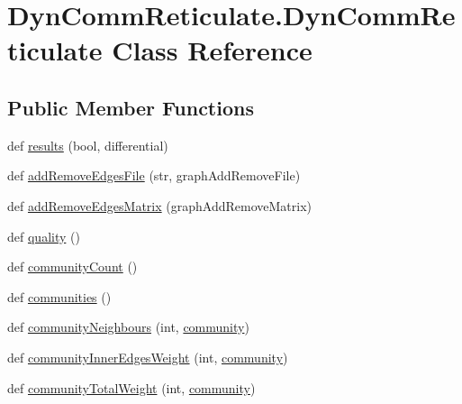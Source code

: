 \hypertarget{classDynCommReticulate_1_1DynCommReticulate}{}\section{Dyn\+Comm\+Reticulate.\+Dyn\+Comm\+Reticulate Class Reference}
\label{classDynCommReticulate_1_1DynCommReticulate}
\subsection*{Public Member Functions}
\begin{DoxyCompactItemize}
\item 
def \hyperlink{classDynCommReticulate_1_1DynCommReticulate_a82340da0cccc70aa945171cfb92f834f}{results} (bool, differential)
\item 
def \hyperlink{classDynCommReticulate_1_1DynCommReticulate_a47fe655ce77cd4baea1c44d1f6bb27d7}{add\+Remove\+Edges\+File} (str, graph\+Add\+Remove\+File)
\item 
def \hyperlink{classDynCommReticulate_1_1DynCommReticulate_a7390853480127f850351b56eeb478d18}{add\+Remove\+Edges\+Matrix} (graph\+Add\+Remove\+Matrix)
\item 
def \hyperlink{classDynCommReticulate_1_1DynCommReticulate_a400176423d9d491f6cf07f1daf45eeda}{quality} ()
\item 
def \hyperlink{classDynCommReticulate_1_1DynCommReticulate_acff447e33f3e28423119360cbccc9680}{community\+Count} ()
\item 
def \hyperlink{classDynCommReticulate_1_1DynCommReticulate_aef5c36a02bf98778e1f6ce3e5fa8fa32}{communities} ()
\item 
def \hyperlink{classDynCommReticulate_1_1DynCommReticulate_a53c20c705c108420a2d2829b0ee62c1e}{community\+Neighbours} (int, \hyperlink{classDynCommReticulate_1_1DynCommReticulate_a074fd63ac9e9bb725a1e332ebf75dd56}{community})
\item 
def \hyperlink{classDynCommReticulate_1_1DynCommReticulate_ab0939d23329dfe46977718f584fbe4f3}{community\+Inner\+Edges\+Weight} (int, \hyperlink{classDynCommReticulate_1_1DynCommReticulate_a074fd63ac9e9bb725a1e332ebf75dd56}{community})
\item 
def \hyperlink{classDynCommReticulate_1_1DynCommReticulate_a589e60b07b7d0a2c49a743b9d0b74694}{community\+Total\+Weight} (int, \hyperlink{classDynCommReticulate_1_1DynCommReticulate_a074fd63ac9e9bb725a1e332ebf75dd56}{community})
\item 

\end{DoxyCompactItemize}
